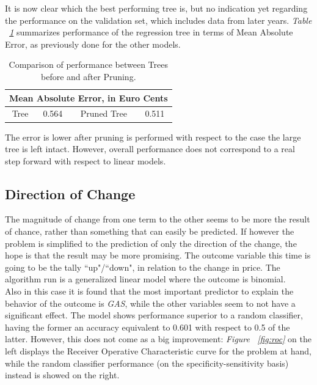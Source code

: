 \documentclass[a4paper,12pt]{book}
\begin{document}
It is now clear which the best performing tree is, but no indication yet regarding the performance on the validation set, which includes data from later years. \textit{Table ~\ref{Tab:prune}} summarizes performance of the regression tree in terms of Mean Absolute Error, as previously done for the other models.

\begin{table}[tb]
\begin{center}
\begin{tabular}{|c|c|c|c|}
\hline
\multicolumn{4}{|c|}{Mean Absolute Error, in Euro Cents}\\
\hline
Tree&0.564&Pruned Tree&0.511\\
\hline
\end{tabular}
\caption{Comparison of performance between Trees before and after Pruning.}
\label{Tab:prune}
\end{center}
\end{table}

The error is lower after pruning is performed with respect to the case the large tree is left intact. However, overall performance does not correspond to a real step forward with respect to linear models.

\subsection{Direction of Change}

The magnitude of change from one term to the other seems to be more the result of chance, rather than something that can easily be predicted. If however the problem is simplified to the prediction of only the direction of the change, the hope is that the result may be more promising. The outcome variable this time is going to be the tally ``up"/``down", in relation to the change in price. The algorithm run is a generalized linear model where the outcome is binomial.\\

Also in this case it is found that the most important predictor to explain the behavior of the outcome is \textit{GAS}, while the other variables seem to not have a significant effect. The model shows performance superior to a random classifier, having the former an accuracy equivalent to 0.601 with respect to 0.5 of the latter. However, this does not come as a big improvement: \textit{Figure ~\ref{fig:roc}} on the left displays the Receiver Operative Characteristic curve for the problem at hand, while the random classifier performance (on the specificity-sensitivity basis) instead is showed on the right.
\end{document}
